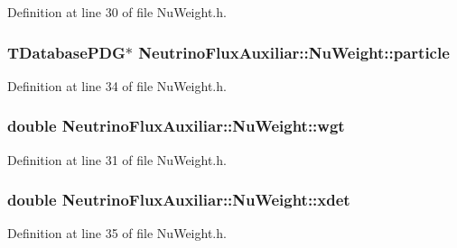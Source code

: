 Definition at line 30 of file Nu\-Weight.\-h.

\hypertarget{class_neutrino_flux_auxiliar_1_1_nu_weight_aa35fc1d624cd975a9657f1a081a776ca}{
\subsubsection[{particle}]{\setlength{\rightskip}{0pt plus 5cm}T\-Database\-P\-D\-G$\ast$ Neutrino\-Flux\-Auxiliar\-::\-Nu\-Weight\-::particle\hspace{0.3cm}{\ttfamily [private]}}}\label{class_neutrino_flux_auxiliar_1_1_nu_weight_aa35fc1d624cd975a9657f1a081a776ca}


Definition at line 34 of file Nu\-Weight.\-h.

\hypertarget{class_neutrino_flux_auxiliar_1_1_nu_weight_a53e3e4d489356d71c6493e9e4ae11250}{
\subsubsection[{wgt}]{\setlength{\rightskip}{0pt plus 5cm}double Neutrino\-Flux\-Auxiliar\-::\-Nu\-Weight\-::wgt}}\label{class_neutrino_flux_auxiliar_1_1_nu_weight_a53e3e4d489356d71c6493e9e4ae11250}


Definition at line 31 of file Nu\-Weight.\-h.

\hypertarget{class_neutrino_flux_auxiliar_1_1_nu_weight_a9ea8df1e61c18a5a795746c182c31a5a}{
\subsubsection[{xdet}]{\setlength{\rightskip}{0pt plus 5cm}double Neutrino\-Flux\-Auxiliar\-::\-Nu\-Weight\-::xdet\hspace{0.3cm}{\ttfamily [private]}}}\label{class_neutrino_flux_auxiliar_1_1_nu_weight_a9ea8df1e61c18a5a795746c182c31a5a}


Definition at line 35 of file Nu\-Weight.\-h.

